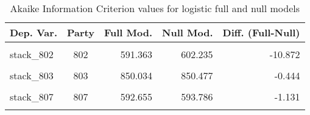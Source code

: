 \documentclass[
]{article}
\begin{document}
\begin{table}[!h]

\caption{\label{tab:unnamed-chunk-74}Akaike Information Criterion values for logistic full and null models 
        \label{table:logit_aic_de}}
\centering
\begin{tabular}[t]{lcrrr}
\toprule
Dep. Var. & Party & Full Mod. & Null Mod. & Diff. (Full-Null)\\
\midrule
\cellcolor{gray!6}{stack\_801} & \cellcolor{gray!6}{801} & \cellcolor{gray!6}{783.323} & \cellcolor{gray!6}{844.663} & \cellcolor{gray!6}{-61.339}\\
stack\_802 & 802 & 591.363 & 602.235 & -10.872\\
\cellcolor{gray!6}{stack\_805} & \cellcolor{gray!6}{805} & \cellcolor{gray!6}{371.471} & \cellcolor{gray!6}{373.555} & \cellcolor{gray!6}{-2.084}\\
stack\_803 & 803 & 850.034 & 850.477 & -0.444\\
\cellcolor{gray!6}{stack\_804} & \cellcolor{gray!6}{804} & \cellcolor{gray!6}{374.707} & \cellcolor{gray!6}{384.835} & \cellcolor{gray!6}{-10.128}\\
\addlinespace
stack\_807 & 807 & 592.655 & 593.786 & -1.131\\
\cellcolor{gray!6}{stack\_806} & \cellcolor{gray!6}{806} & \cellcolor{gray!6}{123.144} & \cellcolor{gray!6}{111.226} & \cellcolor{gray!6}{11.918}\\
\bottomrule
\end{tabular}
\end{table}
\end{document}
